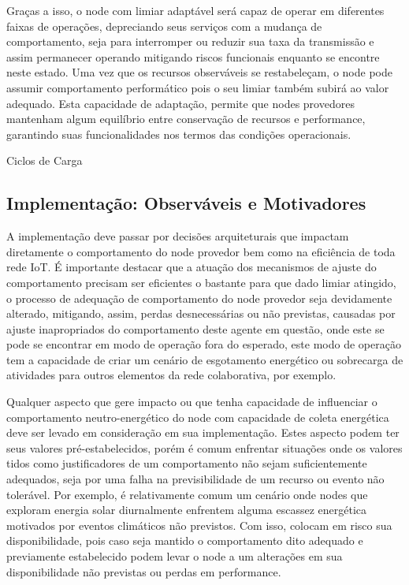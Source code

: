 \begin{itemize}
    Graças a isso, o node com limiar adaptável será capaz de operar em diferentes faixas de operações, depreciando seus serviços com a mudança de comportamento, seja para interromper ou reduzir sua taxa da transmissão e assim permanecer operando mitigando riscos funcionais enquanto se encontre neste estado. Uma vez que os recursos observáveis se restabeleçam, o node pode assumir comportamento performático pois o seu limiar também subirá ao valor adequado. Esta capacidade de adaptação, permite que nodes provedores mantenham algum equilíbrio entre conservação de recursos e performance, garantindo suas funcionalidades nos termos das condições operacionais.
    
 
    
\end{itemize}


Ciclos de Carga


\subsection{Implementação: Observáveis e Motivadores}

A implementação deve passar por decisões arquiteturais que impactam diretamente o comportamento do node provedor bem como na eficiência de toda rede \ac{IoT}. É importante destacar que a atuação dos mecanismos de ajuste do comportamento precisam ser eficientes o bastante para que dado limiar atingido, o processo de adequação de comportamento do node provedor seja devidamente alterado, mitigando, assim, perdas desnecessárias ou não previstas, causadas por ajuste inapropriados do comportamento deste agente em questão, onde este se pode se encontrar em modo de operação fora do esperado, este modo de operação tem a capacidade de criar um cenário de esgotamento energético ou sobrecarga de atividades para outros elementos da rede colaborativa, por exemplo.

Qualquer aspecto que gere impacto ou que tenha capacidade de influenciar o comportamento neutro-energético do node com capacidade de coleta energética deve ser levado em consideração em sua implementação. Estes aspecto podem ter seus valores pré-estabelecidos, porém é comum enfrentar situações onde os valores tidos como justificadores de um comportamento não sejam suficientemente adequados, seja por uma falha na previsibilidade de um recurso ou evento não tolerável. Por exemplo, é relativamente comum um cenário onde nodes que exploram energia solar diurnalmente enfrentem alguma escassez energética motivados por eventos climáticos não previstos. Com isso, colocam em risco sua disponibilidade, pois caso seja mantido o comportamento dito adequado e previamente estabelecido podem levar o node a um alterações em sua disponibilidade não previstas ou perdas em performance. 

